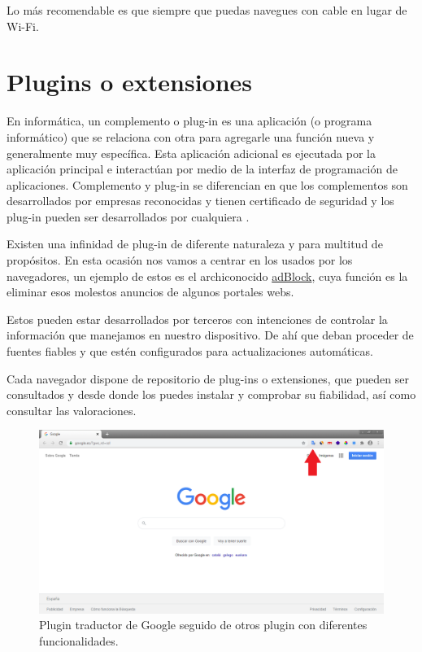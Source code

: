 \documentclass[
  spanish,
  a4paper,
  openany]{book}
\begin{document}
Lo más recomendable es que siempre que puedas navegues con cable en lugar de Wi-Fi.

\hypertarget{plugins-o-extensiones}{%
\section{Plugins o extensiones}\label{plugins-o-extensiones}}

En informática, un complemento o plug-in es una aplicación (o programa informático) que se relaciona con otra para agregarle una función nueva y generalmente muy específica. Esta aplicación adicional es ejecutada por la aplicación principal e interactúan por medio de la interfaz de programación de aplicaciones. Complemento y plug-in se diferencian en que los complementos son desarrollados por empresas reconocidas y tienen certificado de seguridad y los plug-in pueden ser desarrollados por cualquiera \citep{IONOS-plugin}.

Existen una infinidad de plug-in de diferente naturaleza y para multitud de propósitos. En esta ocasión nos vamos a centrar en los usados por los navegadores, un ejemplo de estos es el archiconocido \href{https://getadblock.com/}{adBlock}, cuya función es la eliminar esos molestos anuncios de algunos portales webs.

Estos pueden estar desarrollados por terceros con intenciones de controlar la información que manejamos en nuestro dispositivo. De ahí que deban proceder de fuentes fiables y que estén configurados para actualizaciones automáticas.

Cada navegador dispone de repositorio de plug-ins o extensiones, que pueden ser consultados y desde donde los puedes instalar y comprobar su fiabilidad, así como consultar las valoraciones.

\begin{figure}

{\centering \includegraphics[width=0.75\linewidth]{images/plugin-navegador} 

}

\caption{Plugin traductor de Google seguido de otros plugin con diferentes funcionalidades.}\label{fig:unnamed-chunk-12}
\end{figure}
\end{document}
